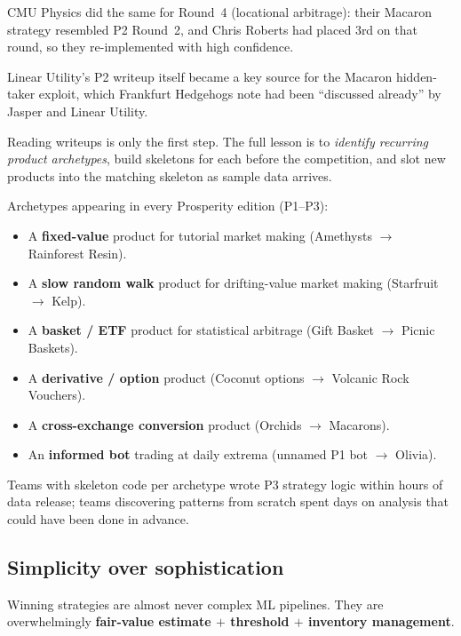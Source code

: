 CMU Physics did the same for Round~4 (locational arbitrage): their
Macaron strategy resembled P2 Round~2, and Chris Roberts had
placed 3rd on that round, so they re-implemented with high
confidence.

Linear Utility's P2 writeup itself became a key source for the
Macaron hidden-taker exploit, which Frankfurt Hedgehogs note had
been ``discussed already'' by Jasper and Linear Utility.

Reading writeups is only the first step.  The full lesson is to
\emph{identify recurring product archetypes}, build skeletons for
each before the competition, and slot new products into the
matching skeleton as sample data arrives.

\begin{keyfactbox}
Archetypes appearing in every Prosperity edition (P1--P3):
\begin{itemize}
  \item A \textbf{fixed-value} product for tutorial market making
        (Amethysts $\to$ Rainforest Resin).
  \item A \textbf{slow random walk} product for drifting-value
        market making (Starfruit $\to$ Kelp).
  \item A \textbf{basket / ETF} product for statistical arbitrage
        (Gift Basket $\to$ Picnic Baskets).
  \item A \textbf{derivative / option} product
        (Coconut options $\to$ Volcanic Rock Vouchers).
  \item A \textbf{cross-exchange conversion} product
        (Orchids $\to$ Macarons).
  \item An \textbf{informed bot} trading at daily extrema
        (unnamed P1 bot $\to$ Olivia).
\end{itemize}
Teams with skeleton code per archetype wrote P3 strategy logic
within hours of data release; teams discovering patterns from
scratch spent days on analysis that could have been done in
advance.
\end{keyfactbox}

\subsection{Simplicity over sophistication}
\label{sec:simplicity}

Winning strategies are almost never complex ML pipelines.  They
are overwhelmingly \textbf{fair-value estimate $+$ threshold $+$
inventory management}.

